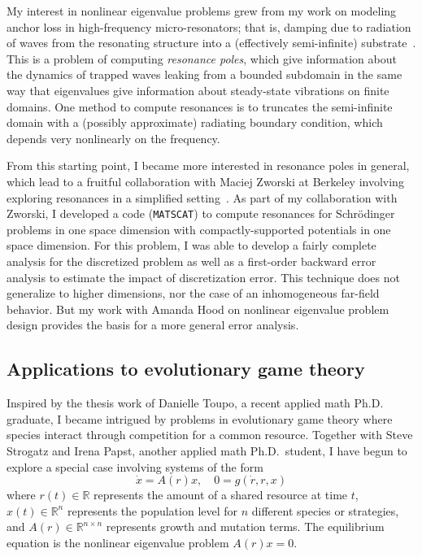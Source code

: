 \documentclass{amsart}
\newcommand{\bbR}{\mathbb{R}}
\begin{document}
My interest in nonlinear eigenvalue problems grew from my work on
modeling anchor loss in high-frequency micro-resonators; that is,
damping due to radiation of waves from the resonating structure into a
(effectively semi-infinite)
substrate~\cite{2004-para,2005-mems,2005-ijnme,2005-sensors}.  This is a
problem of computing {\em resonance poles}, which give information about
the dynamics of trapped waves leaking from a bounded
subdomain in the same way that eigenvalues give information about
steady-state vibrations on finite domains. One method to
compute resonances is to truncates the semi-infinite domain with a
(possibly approximate) radiating boundary condition, which depends very
nonlinearly on the frequency.

From this starting point, I became more interested in resonance poles in
general, which lead to a fruitful collaboration with Maciej Zworski at
Berkeley involving exploring resonances in a simplified
setting~\cite{2007-symmetry}.  As part of my collaboration with Zworski,
I developed a code ({\tt MATSCAT}) to compute resonances for
Schr{\"o}dinger problems in one space dimension with compactly-supported
potentials in one space dimension.  For this problem, I was able to
develop a fairly complete analysis for the discretized problem as well
as a first-order backward error analysis to estimate the impact of
discretization error.  This technique does not generalize to higher
dimensions, nor the case of an inhomogeneous far-field behavior.  But
my work with Amanda Hood on nonlinear eigenvalue problem design provides
the basis for a more general error analysis.

\subsection*{Applications to evolutionary game theory}

Inspired by the thesis work of Danielle Toupo, a recent applied math
Ph.D. graduate, I became intrigued by problems in
evolutionary game theory where species interact through competition for
a common resource.  Together with Steve Strogatz and Irena Papst,
another applied math Ph.D.~student, I have begun to explore a
special case involving systems of the form
\[
  \dot{x} = A(r) x, \quad  0 = g(\dot{r}, r, x)
\]
where $r(t) \in \bbR$ represents the amount of a shared resource at
time $t$, $x(t) \in \bbR^n$ represents the population level for $n$
different species or strategies, and $A(r) \in \bbR^{n \times n}$
represents growth and mutation terms.  The equilibrium equation is
the nonlinear eigenvalue problem $A(r) x = 0$.
\end{document}
